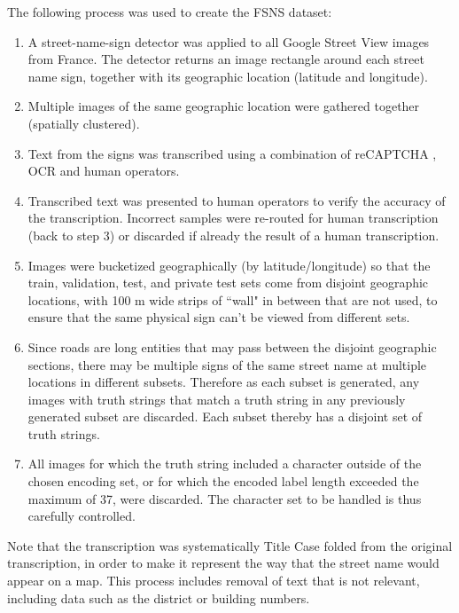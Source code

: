 \documentclass[runningheads]{llncs}
\begin{document}
The following process was used to create the FSNS dataset:
\begin{enumerate}
  \item A street-name-sign detector was applied to all Google Street View images from France. The detector returns an image rectangle around each street name sign, together with its geographic location (latitude and longitude).
  \item Multiple images of the same geographic location were gathered together (spatially clustered).
  \item Text from the signs was transcribed using a combination of reCAPTCHA \cite{recaptcha}, OCR and human operators.
  \item Transcribed text was presented to human operators to verify the accuracy of the transcription. Incorrect samples were re-routed for human transcription (back to step 3) or discarded if already the result of a human transcription.
  \item Images were bucketized geographically (by latitude/longitude) so that the train, validation, test,
 and private test sets come from disjoint geographic locations, with 100 m wide strips of ``wall" in
 between that are not used, to ensure that the same physical sign can't be viewed from different sets.
  \item Since roads are long entities that may pass between the disjoint geographic sections, there may be multiple signs of the same street name at multiple locations in different subsets. Therefore as each subset is generated, any images with truth strings that match a truth string in any previously generated subset are discarded. Each subset thereby has a disjoint set of truth strings.
  \item All images for which the truth string included a character outside of the chosen encoding set, or for which the encoded label length exceeded the maximum of 37, were discarded. The character set to be handled is thus carefully controlled.
\end{enumerate}

Note that the transcription was systematically Title Case folded from the original transcription, in order
 to make it represent the way that the street name would appear on a map. This process includes removal of
 text that is not relevant, including data such as the district or building numbers.
\end{document}
